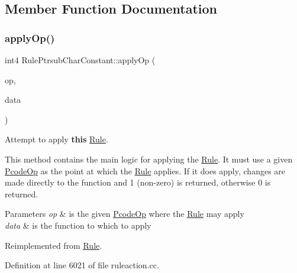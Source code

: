 \subsection{Member Function Documentation}
\mbox{\label{class_rule_ptrsub_char_constant_ab5a326704b8090e54f8afc9db135fd79}} 
\subsubsection{\texorpdfstring{applyOp()}{applyOp()}}
{\footnotesize\ttfamily int4 Rule\+Ptrsub\+Char\+Constant\+::apply\+Op (\begin{DoxyParamCaption}\item[{\mbox{\hyperlink{class_pcode_op}{Pcode\+Op}} $\ast$}]{op,  }\item[{\mbox{\hyperlink{class_funcdata}{Funcdata}} \&}]{data }\end{DoxyParamCaption})\hspace{0.3cm}{\ttfamily [virtual]}}



Attempt to apply {\bfseries{this}} \mbox{\hyperlink{class_rule}{Rule}}. 

This method contains the main logic for applying the \mbox{\hyperlink{class_rule}{Rule}}. It must use a given \mbox{\hyperlink{class_pcode_op}{Pcode\+Op}} as the point at which the \mbox{\hyperlink{class_rule}{Rule}} applies. If it does apply, changes are made directly to the function and 1 (non-\/zero) is returned, otherwise 0 is returned. 
\begin{DoxyParams}{Parameters}
{\em op} & is the given \mbox{\hyperlink{class_pcode_op}{Pcode\+Op}} where the \mbox{\hyperlink{class_rule}{Rule}} may apply \\
\hline
{\em data} & is the function to which to apply \\
\hline
\end{DoxyParams}


Reimplemented from \mbox{\hyperlink{class_rule_a4e3e61f066670175009f60fb9dc60848}{Rule}}.



Definition at line 6021 of file ruleaction.\+cc.

